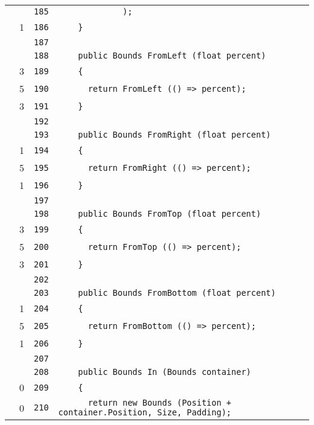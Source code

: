 \documentclass[a4paper,10pt]{article}
\begin{document}
\begin{longtable}[l]{lrrl}
\cellcolor{gray} &  & \verb~185~ & \verb~             );~\\
\cellcolor{green} & 1 & \verb~186~ & \verb~    }~\\
\cellcolor{gray} &  & \verb~187~ & \verb~~\\
\cellcolor{gray} &  & \verb~188~ & \verb~    public Bounds FromLeft (float percent)~\\
\cellcolor{green} & 3 & \verb~189~ & \verb~    {~\\
\cellcolor{green} & 5 & \verb~190~ & \verb~      return FromLeft (() => percent);~\\
\cellcolor{green} & 3 & \verb~191~ & \verb~    }~\\
\cellcolor{gray} &  & \verb~192~ & \verb~~\\
\cellcolor{gray} &  & \verb~193~ & \verb~    public Bounds FromRight (float percent)~\\
\cellcolor{green} & 1 & \verb~194~ & \verb~    {~\\
\cellcolor{green} & 5 & \verb~195~ & \verb~      return FromRight (() => percent);~\\
\cellcolor{green} & 1 & \verb~196~ & \verb~    }~\\
\cellcolor{gray} &  & \verb~197~ & \verb~~\\
\cellcolor{gray} &  & \verb~198~ & \verb~    public Bounds FromTop (float percent)~\\
\cellcolor{green} & 3 & \verb~199~ & \verb~    {~\\
\cellcolor{green} & 5 & \verb~200~ & \verb~      return FromTop (() => percent);~\\
\cellcolor{green} & 3 & \verb~201~ & \verb~    }~\\
\cellcolor{gray} &  & \verb~202~ & \verb~~\\
\cellcolor{gray} &  & \verb~203~ & \verb~    public Bounds FromBottom (float percent)~\\
\cellcolor{green} & 1 & \verb~204~ & \verb~    {~\\
\cellcolor{green} & 5 & \verb~205~ & \verb~      return FromBottom (() => percent);~\\
\cellcolor{green} & 1 & \verb~206~ & \verb~    }~\\
\cellcolor{gray} &  & \verb~207~ & \verb~~\\
\cellcolor{gray} &  & \verb~208~ & \verb~    public Bounds In (Bounds container)~\\
\cellcolor{red} & 0 & \verb~209~ & \verb~    {~\\
\cellcolor{red} & 0 & \verb~210~ & \verb~      return new Bounds (Position + container.Position, Size, Padding);~\\

\end{longtable}
\end{document}

